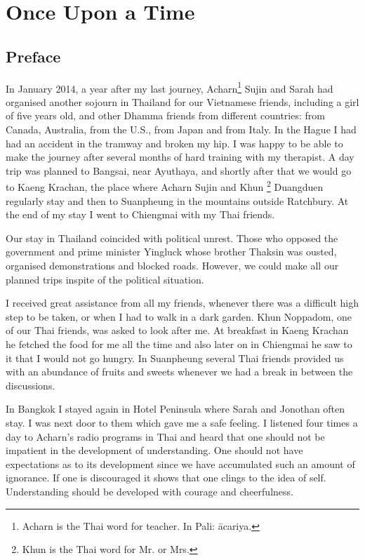 \part{Once Upon a Time}



\chapter{Preface}

In January 2014, a year after my last journey, Acharn\footnote{Acharn is the Thai word
for teacher. In Pali: ācariya.} Sujin and Sarah had
organised another sojourn in Thailand for our Vietnamese friends,
including a girl of five years old, and other Dhamma friends from
different countries: from Canada, Australia, from the U.S., from Japan
and from Italy. In the Hague I had had an accident in the tramway and
broken my hip. I was happy to be able to make the journey after several
months of hard training with my therapist. A day trip was planned to
Bangsai, near Ayuthaya, and shortly after that we would go to Kaeng
Krachan, the place where Acharn Sujin and Khun
\footnote{Khun is the Thai word
for Mr. or Mrs.} Duangduen regularly stay
and then to Suanpheung in the mountains outside Ratchbury. At the end of
my stay I went to Chiengmai with my Thai friends.

Our stay in Thailand coincided with political unrest. Those who opposed
the government and prime minister Yingluck whose brother Thaksin was
ousted, organised demonstrations and blocked roads. However, we could
make all our planned trips inspite of the political situation.

I received great assistance from all my friends, whenever there was a
difficult high step to be taken, or when I had to walk in a dark garden.
Khun Noppadom, one of our Thai friends, was asked to look after me. At
breakfast in Kaeng Krachan he fetched the food for me all the time and
also later on in Chiengmai he saw to it that I would not go hungry. In
Suanpheung several Thai friends provided us with an abundance of fruits
and sweets whenever we had a break in between the discussions.

In Bangkok I stayed again in Hotel Peninsula where Sarah and Jonothan
often stay. I was next door to them which gave me a safe feeling. I
listened four times a day to Acharn's radio programs in Thai and heard
that one should not be impatient in the development of understanding.
One should not have expectations as to its development since we have
accumulated such an amount of ignorance. If one is discouraged it shows
that one clings to the idea of self. Understanding should be developed
with courage and cheerfulness.

